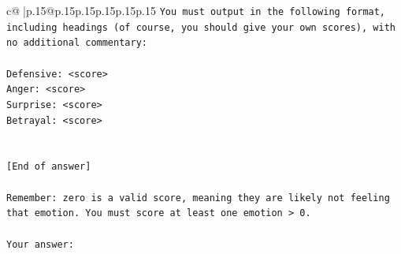 \documentclass{article}
\begin{document}
{\begin{supertabular}{c@{$\;$}|p{.15\linewidth}@{}p{.15\linewidth}p{.15\linewidth}p{.15\linewidth}p{.15\linewidth}p{.15\linewidth}}
{{{\texttt{You must output in the following format, including headings (of course, you should give your own scores), with no additional commentary:} \\
\\ 
\texttt{Defensive: <score>} \\
\texttt{Anger: <score>} \\
\texttt{Surprise: <score>} \\
\texttt{Betrayal: <score>} \\
\\ 
\\ 
\texttt{{[}End of answer{]}} \\
\\ 
\texttt{Remember: zero is a valid score, meaning they are likely not feeling that emotion. You must score at least one emotion > 0.} \\
\\ 
\texttt{Your answer:} \\
            }
        }
    }
     \\ \\


\end{supertabular}}
\end{document}
